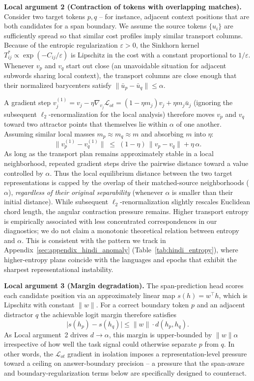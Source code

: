 \documentclass[11pt]{article}
\begin{document}
\textbf{Local argument 2 (Contraction of tokens with overlapping matches).} Consider two target tokens $p, q$ -- for instance, adjacent context positions that are both candidates for a span boundary. We assume the source tokens $\{u_i\}$ are sufficiently spread so that similar cost profiles imply similar transport columns. Because of the entropic regularization $\varepsilon > 0$, the Sinkhorn kernel $T^*_{ij} \propto \exp(-C_{ij}/\varepsilon)$ is Lipschitz in the cost with a constant proportional to $1/\varepsilon$. Whenever $v_p$ and $v_q$ start out close (an unavoidable situation for adjacent subwords sharing local context), the transport columns are close enough that their normalized barycenters satisfy $\|\bar{u}_p - \bar{u}_q\| \le \alpha$.

A gradient step $v_j^{(1)} = v_j - \eta \nabla_{v_j}\mathcal{L}_{ot} = (1-\eta m_j)v_j + \eta m_j \bar{u}_j$ (ignoring the subsequent $\ell_2$-renormalization for the local analysis) therefore moves $v_p$ and $v_q$ toward two attractor points that themselves lie within $\alpha$ of one another. Assuming similar local masses $m_p \approx m_q \approx m$ and absorbing $m$ into $\eta$:
\begin{equation*}
\|v_p^{(1)} - v_q^{(1)}\| \;\le\; (1-\eta)\,\|v_p-v_q\| + \eta\,\alpha.
\end{equation*}
As long as the transport plan remains approximately stable in a local neighborhood, repeated gradient steps drive the pairwise distance toward a value controlled by $\alpha$. Thus the local equilibrium distance between the two target representations is capped by the overlap of their matched-source neighborhoods ($\alpha$), \emph{regardless of their original separability} (whenever $\alpha$ is smaller than their initial distance). While subsequent $\ell_2$-renormalization slightly rescales Euclidean chord length, the angular contraction pressure remains. Higher transport entropy is empirically associated with less concentrated correspondences in our diagnostics; we do not claim a monotonic theoretical relation between entropy and $\alpha$. This is consistent with the pattern we track in Appendix~\ref{sec:appendix_hindi_anomaly} (Table~\ref{tab:hindi_entropy}), where higher-entropy plans coincide with the languages and epochs that exhibit the sharpest representational instability.

\textbf{Local argument 3 (Margin degradation).} The span-prediction head scores each candidate position via an approximately linear map $s(h)=w^\top h$, which is Lipschitz with constant $\|w\|$. For a correct boundary token $p$ and an adjacent distractor $q$ the achievable logit margin therefore satisfies
\begin{equation*}
\bigl|s(h_p)-s(h_q)\bigr| \le \|w\|\cdot d(h_p,h_q).
\end{equation*}
As Local argument~2 drives $d\to\alpha$, this margin is upper-bounded by $\|w\|\alpha$ irrespective of how well the task signal could otherwise separate $p$ from $q$. In other words, the $\mathcal{L}_{ot}$ gradient in isolation imposes a representation-level pressure toward a ceiling on answer-boundary precision -- a pressure that the span-aware and boundary-regularization terms below are specifically designed to counteract.
\end{document}
